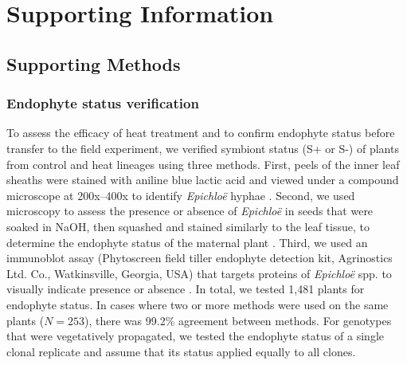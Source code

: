 \documentclass[12pt]{article}\usepackage[]{graphicx}\usepackage[dvipsnames]{xcolor}
\begin{document}
{\begin{table}[h]
\begin{tabular}{llrr}
\bottomrule
\end{tabular}
\end{table}
\clearpage
\appendix

\setcounter{figure}{0}
\setcounter{table}{0}
\setcounter{equation}{0}
\setcounter{section}{0}

\renewcommand{\thesection}{S.\arabic{section}}

\renewcommand{\theequation}{S\arabic{equation}}

\renewcommand{\figurename}{Fig}
\renewcommand{\thefigure}{S\arabic{figure}}

\renewcommand{\thetable}{S\arabic{table}}
\renewcommand{\tablename}{Table}

\section {Supporting Information}

\subsection {Supporting Methods}
\subsubsection {Endophyte status verification}
To assess the efficacy of heat treatment and to confirm endophyte status before transfer to the field experiment, we verified symbiont status (S+ or S-) of plants from control and heat lineages using three methods. 
First, peels of the inner leaf sheaths were stained with aniline blue lactic acid and viewed under a compound microscope at 200x–400x to identify \emph{Epichloë} hyphae \citep{jackson1988rapid}. 
Second, we used microscopy to assess the presence or absence of \emph{Epichloë} in seeds that were soaked in NaOH, then squashed and stained similarly to the leaf tissue, to determine the endophyte status of the maternal plant \citep{fowler2025increasing}. 
Third, we used an immunoblot assay (Phytoscreen field tiller endophyte detection kit, Agrinostics Ltd. Co., Watkinsville, Georgia, USA) that targets proteins of \emph{Epichloë} spp. to visually indicate presence or absence \citep{koh2006rapid}. 
In total, we tested 1,481 plants for endophyte status. 
In cases where two or more methods were used on the same plants ($N=253$), there was 99.2\% agreement between methods.
For genotypes that were vegetatively propagated, we tested the endophyte status of a single clonal replicate and assume that its status applied equally to all clones. 

}
\end{document}
